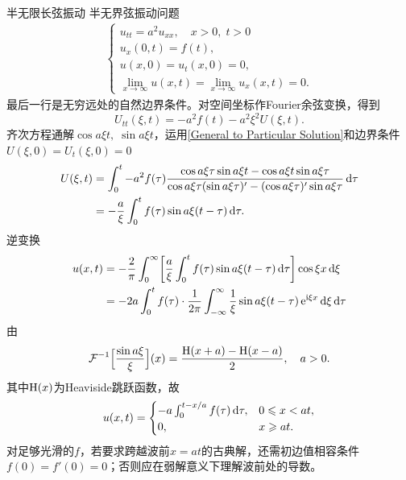 \begin{example}{半无限长弦振动}{}
	半无界弦振动问题
	\begin{align*}
		\begin{cases}
			u_{tt} = a^2u_{xx},\quad x > 0,\;t > 0\\
			u_x(0,t) = f(t),\\ %
			u(x,0) = u_t(x,0) = 0,\\
			\lim_{x\to\infty}u(x,t) = \lim_{x\to\infty}u_x(x,t) = 0.
		\end{cases}
	\end{align*}
	最后一行是无穷远处的自然边界条件。对空间坐标作Fourier余弦变换，得到
	\[
		U_{tt}(\xi,t) = -a^2f(t) - a^2\xi^2U(\xi,t).
	\]
	齐次方程通解$\cos a\xi t,\;\sin a\xi t$，运用\eqref{General to Particular Solution}和边界条件$U(\xi,0) = U_t(\xi,0) = 0$
	\begin{align*}
		U(\xi,t) &= \int_0^t - a^2f(\tau)\frac{\cos a\xi\tau\sin a\xi t - \cos a\xi t\sin a\xi\tau}{\cos a\xi\tau(\sin a\xi\tau)' - (\cos a\xi\tau)'\sin a\xi\tau}\mathop{}\!\mathrm{d}\tau\\
		&= -\frac a\xi\int_0^tf(\tau)\sin a\xi(t - \tau)\mathop{}\!\mathrm{d}\tau.
	\end{align*}
	逆变换
	\begin{align*}
		u(x,t) &= -\frac{2}\pi\int_0^\infty\biggl[\frac a\xi\int_0^tf(\tau)\sin a\xi(t - \tau)\mathop{}\!\mathrm{d}\tau\biggr]\cos \xi x\mathop{}\!\mathrm{d}\xi\\
		&= -2a\int_0^tf(\tau) \cdot \frac1{2\pi}\int_{-\infty}^\infty\frac1\xi\sin a\xi(t - \tau)\mathop{}\!\mathrm{e}^{\mathrm{i}\xi x}\mathop{}\!\mathrm{d}\xi\mathop{}\!\mathrm{d}\tau
	\end{align*}
	由
	\[
		\operatorname{\mathcal{F}}^{-1}\Bigl[\frac{\sin a\xi}\xi\Bigr](x) = \frac{\operatorname{H}(x + a) - \operatorname{H}(x - a)}2,\quad a > 0.
	\]
	其中$\operatorname{H}(x)$为Heaviside跳跃函数，故
	\begin{equation}
		\label{eq:mmp-half-line-wave-flux}
		u(x,t)  %
		= \begin{cases}-a\int_0^{t-x/a}f(\tau)\d\tau,&0 \leq x < at,\\0,&x \geq at.\end{cases}
	\end{equation}
对足够光滑的$f$，若要求跨越波前$x = at$的古典解，还需初边值相容条件$f(0) = f'(0) = 0$；否则应在弱解意义下理解波前处的导数。
\end{example}

